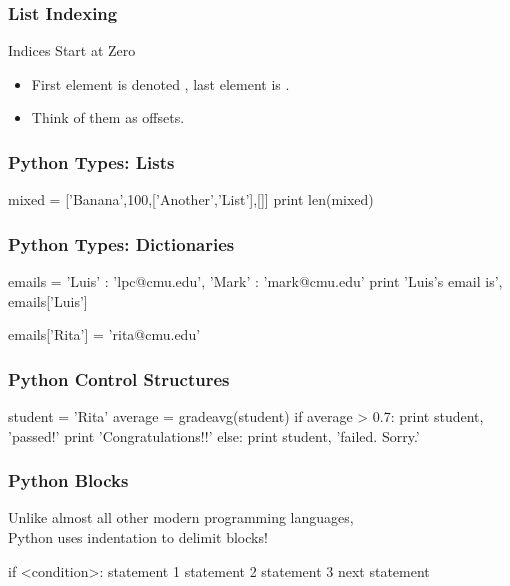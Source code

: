 \begin{frame}[fragile]
\frametitle{List Indexing}
\begin{block}{Indices Start at Zero}
\begin{itemize}
\item First element is denoted , last element is .
\item Think of them as \alert{offsets}.
\end{itemize}
\end{block}
\end{frame}


\begin{frame}[fragile]
\frametitle{Python Types: Lists}

\begin{python}
mixed = ['Banana',100,['Another','List'],[]]
print len(mixed)
\end{python}

\end{frame}

\begin{frame}[fragile]
\frametitle{Python Types: Dictionaries}
\begin{python}
emails = { 'Luis' : 'lpc@cmu.edu',
           'Mark' : 'mark@cmu.edu' }
print 'Luis's email is', emails['Luis']

emails['Rita'] = 'rita@cmu.edu'
\end{python}

\end{frame}

\begin{frame}[fragile]
\frametitle{Python Control Structures}

\begin{python}
student = 'Rita'
average = gradeavg(student)
if average > 0.7:
    print student, 'passed!'
    print 'Congratulations!!'
else:
    print student, 'failed. Sorry.'
\end{python}
\end{frame}

\begin{frame}[fragile]
\frametitle{Python Blocks}

Unlike almost all other modern programming languages,\\
Python uses \alert{indentation} to delimit blocks!

\begin{python}
if <condition>:
    statement 1
    statement 2
    statement 3
next statement
\end{python}

\end{frame}

